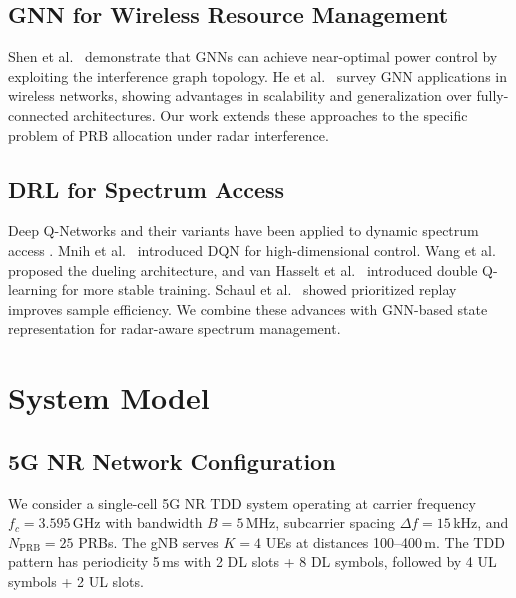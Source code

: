\documentclass[conference]{IEEEtran}
\begin{document}
\subsection{GNN for Wireless Resource Management}

Shen et al.\ \cite{shen2021graph_resource} demonstrate that GNNs can achieve near-optimal power control by exploiting the interference graph topology. He et al.\ \cite{he2021gnn_wireless} survey GNN applications in wireless networks, showing advantages in scalability and generalization over fully-connected architectures. Our work extends these approaches to the specific problem of PRB allocation under radar interference.

\subsection{DRL for Spectrum Access}

Deep Q-Networks and their variants have been applied to dynamic spectrum access \cite{lee2020drl_resource, nasir2021gnn_resource}. Mnih et al.\ \cite{mnih2015dqn} introduced DQN for high-dimensional control. Wang et al.\ \cite{wang2016dueling} proposed the dueling architecture, and van Hasselt et al.\ \cite{hasselt2016double} introduced double Q-learning for more stable training. Schaul et al.\ \cite{schaul2016per} showed prioritized replay improves sample efficiency. We combine these advances with GNN-based state representation for radar-aware spectrum management.

\section{System Model}

\subsection{5G NR Network Configuration}

We consider a single-cell 5G NR TDD system operating at carrier frequency $f_c = 3.595$\,GHz with bandwidth $B = 5$\,MHz, subcarrier spacing $\Delta f = 15$\,kHz, and $N_{\text{PRB}} = 25$ PRBs. The gNB serves $K = 4$ UEs at distances 100--400\,m. The TDD pattern has periodicity 5\,ms with 2 DL slots + 8 DL symbols, followed by 4 UL symbols + 2 UL slots.
\end{document}
